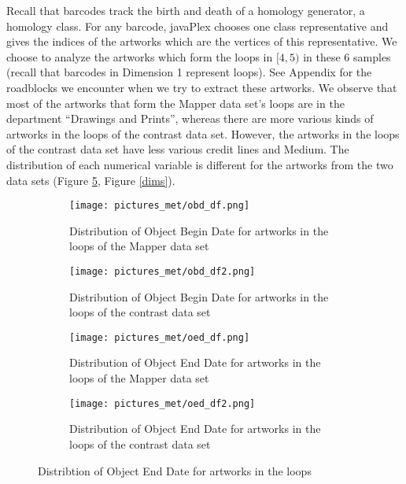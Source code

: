 \documentclass[12pt]{article}
\theoremstyle{definition}
\begin{document}
Recall that barcodes track the birth and death of a homology generator, a homology class. For any barcode, javaPlex chooses one class representative and gives the indices of the artworks which are the vertices of this representative. We choose to analyze the artworks which form the loops in $[4,5)$ in these 6 samples (recall that barcodes in Dimension 1 represent loops). See Appendix for the roadblocks we encounter when we try to extract these artworks. We observe that most of the artworks that form the Mapper data set's loops are in the department ``Drawings and Prints'', whereas there are more various kinds of artworks in the loops of the contrast data set. However, the artworks in the loops of the contrast data set have less various credit lines and Medium. The distribution of each numerical variable is different for the artworks from the two data sets (Figure \ref{obdoed}, Figure \ref{dims}).
\begin{figure}[H]
\centering
\begin{subfigure}{.5\textwidth}
  \centering
  \texttt{[image: pictures\_met/obd\_df.png]} 
  \caption{Distribution of Object Begin Date for artworks in the loops of the Mapper data set}
  \label{fig 4:sub1} 
\end{subfigure}%
\begin{subfigure}{.5\textwidth}
  \centering
  \texttt{[image: pictures\_met/obd\_df2.png]} 
  \caption{Distribution of Object Begin Date for artworks in the loops of the contrast data set}
  \label{fig 4:sub2}
\end{subfigure}
\begin{subfigure}{.5\textwidth}
  \centering
  \texttt{[image: pictures\_met/oed\_df.png]} 
  \caption{Distribution of Object End Date for artworks in the loops of the Mapper data set}
  \label{fig 4:sub3} 
\end{subfigure}%
\begin{subfigure}{.5\textwidth}
  \centering
  \texttt{[image: pictures\_met/oed\_df2.png]} 
  \caption{Distribution of Object End Date for artworks in the loops of the contrast data set}
  \label{fig 4:sub4}
\end{subfigure}
\caption{Distribtion of Object End Date for artworks in the loops}
\label{obdoed}
\end{figure}
\end{document}
